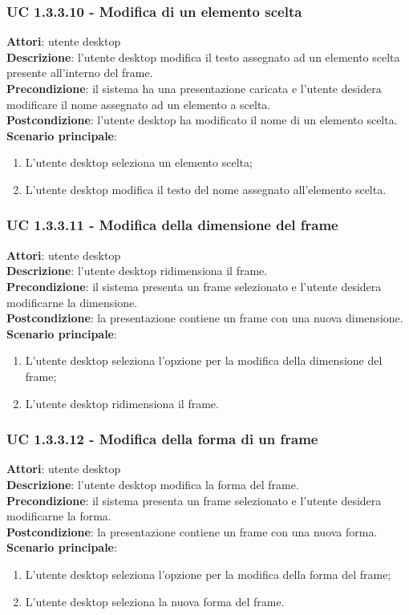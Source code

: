 \subsubsection{UC 1.3.3.10 - Modifica di un elemento scelta}{
	\label{uc1.3.3.10}
	\textbf{Attori}: utente desktop \\
	\textbf{Descrizione}: l'utente desktop modifica il testo assegnato ad un elemento scelta presente all'interno del frame. \\
	\textbf{Precondizione}: il sistema ha una presentazione caricata e l'utente desidera modificare il nome assegnato ad un elemento a scelta.	\\
	\textbf{Postcondizione}: l'utente desktop ha modificato il nome di un elemento scelta.	\\
	\textbf{Scenario principale}:
	\begin{enumerate}
		\item L'utente desktop seleziona un elemento scelta;
		\item L'utente desktop modifica il testo del nome assegnato all'elemento scelta.
	\end{enumerate}
	}
\subsubsection{UC 1.3.3.11 - Modifica della dimensione del frame}{
	\label{uc1.3.3.11}
	\textbf{Attori}: utente desktop \\
	\textbf{Descrizione}: l'utente desktop ridimensiona il frame. \\
	\textbf{Precondizione}: il sistema presenta un frame selezionato e l'utente desidera modificarne la dimensione.	\\
	\textbf{Postcondizione}: la presentazione contiene un frame con una nuova dimensione.	\\
	\textbf{Scenario principale}:
	\begin{enumerate}
		\item L'utente desktop seleziona l'opzione per la modifica della dimensione del frame;
		\item L'utente desktop ridimensiona il frame.
	\end{enumerate}
	}
\subsubsection{UC 1.3.3.12 - Modifica della forma di un frame}{
	\label{uc1.3.3.12}
	\textbf{Attori}: utente desktop \\
	\textbf{Descrizione}: l'utente desktop modifica la forma del frame. \\
	\textbf{Precondizione}: il sistema presenta un frame selezionato e l'utente desidera modificarne la forma.	\\
	\textbf{Postcondizione}: la presentazione contiene un frame con una nuova forma.	\\
	\textbf{Scenario principale}:
	\begin{enumerate}
		\item L'utente desktop seleziona l'opzione per la modifica della forma del frame;
		\item L'utente desktop seleziona la nuova forma del frame.
	\end{enumerate}}
